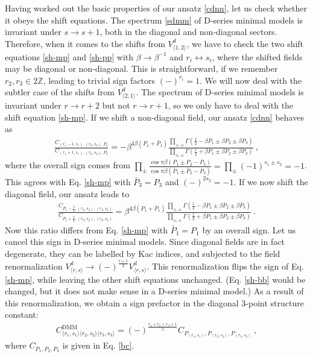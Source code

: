 \documentclass[12pt, a4paper]{article}
\theoremstyle{break}
\begin{document}
Having worked out the basic properties of our ansatz \eqref{cdnn}, let us check whether it obeys the shift equations. The spectrum \eqref{sdmm} of D-series minimal models is invariant under $s\to s+1$, both in the diagonal and non-diagonal sectors. Therefore, when it comes to the shifts from $V^d_{\langle 1,2\rangle}$, we have to check the two shift equations \eqref{sh-mp} and \eqref{sh-pp} with $\beta\to\beta^{-1}$ and $r_i\leftrightarrow s_i$, where the shifted fields may be diagonal or non-diagonal. This is straightforward, if we remember $r_2,r_3\in 2\mathbb{Z}$, leading to trivial sign factors $(-)^{r_i}=1$. We will now deal with the subtler case of the shifts from $V^d_{\langle 2,1\rangle}$. The spectrum of D-series minimal models is invariant under $r\to r+2$ but not $r\to r+1$, so we only have to deal with the shift equation \eqref{sh-mp}. If we shift a non-diagonal field, our ansatz \eqref{cdnn} behaves as 
\begin{align}
 \frac{C_{(r_1-1,s_1),(r_2,s_2),P_3}}{C_{(r_1+1,s_1),(r_2,s_2),P_3}} = - \beta^{4\beta(P_1+\bar P_1)}\frac{\prod_{\pm,\pm} \Gamma(\frac12-\beta \bar P_1\pm \beta\bar P_2\pm \beta P_3)}{\prod_{\pm,\pm} \Gamma(\frac12+\beta P_1\pm \beta P_2\pm \beta P_3)}\ , 
\end{align}
where the overall sign comes from $\prod_\pm \frac{\cos \pi\beta(P_1\pm P_2-P_3)}{\cos\pi\beta(\bar P_1\pm \bar P_2-P_3)} = \prod_\pm (-1)^{s_1\pm s_2} = -1$. This agrees with Eq. \eqref{sh-mp} with $\bar P_3=P_3$ and $(-)^{2s_2}=-1$. If we now shift the diagonal field, our ansatz leads to 
\begin{align}
 \frac{C_{P_1-\frac{\beta}{2},(r_2,s_2),(r_3,s_3)}}{C_{P_1+\frac{\beta}{2},(r_2,s_2),(r_3,s_3)}} =\beta^{4\beta(P_1+\bar P_1)}\frac{\prod_{\pm,\pm} \Gamma(\frac12-\beta P_1\pm \beta\bar P_2\pm \beta \bar P_3)}{\prod_{\pm,\pm} \Gamma(\frac12+\beta P_1\pm \beta P_2\pm \beta P_3)}\ .
\end{align}
Now this ratio differs from Eq. \eqref{sh-mp} with $\bar P_1=P_1$ by an overall sign. Let us cancel this sign in D-series minimal models. Since diagonal fields are in fact degenerate, they can be labelled by Kac indices, and subjected to the field renormalization 
$V^d_{\langle r,s\rangle}\to (-)^{\frac{r+1}{2}} V^d_{\langle r,s\rangle}$. 
This renormalization flips the sign of Eq. \eqref{sh-mp}, while leaving the other shift equations unchanged. (Eq. \eqref{sh-bb} would be changed, but it does not make sense in a D-series minimal model.) As a result of this renormalization, we obtain a sign prefactor in the diagonal 3-point structure constant:
\begin{align}
 \boxed{C^\text{DMM}_{\langle r_1,s_1\rangle\langle r_2,s_2\rangle\langle r_3,s_3\rangle} = (-)^\frac{r_1+r_2+r_3+1}{2} C_{P_{(r_1,s_1)},P_{(r_2,s_2)},P_{(r_3,s_3)}}}\ , 
 \label{cdmm}
\end{align}
where $C_{P_1,P_2,P_3}$ is given in Eq. \eqref{bc}.
\end{document}
